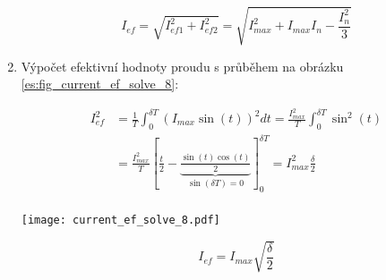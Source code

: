\begin{enumerate}
        \begin{equation}\label{es:eq_current_ef_solve_6}
          I_{ef} = \sqrt{I_{ef1}^2+I_{ef2}^2} = \sqrt{I_{max}^2+I_{max}I_{n} - \frac{I_n^2}{3}}
        \end{equation} 

      \item Výpočet efektivní hodnoty proudu s průběhem na obrázku \ref{es:fig_current_ef_solve_8}:

        \setlength{\parindent}{-10mm}
        \begin{minipage}[b]{0.6\textwidth}%
          \begin{align*}
            I_{ef}^2 
              &=  \frac{1}{T}\int_0^{\delta T}{\left(I_{max}\sin(t)\right)^2}dt=
                  \frac{I_{max}^2}{T}\int_0^{\delta T}{\sin^2(t)}                                 \\ 
              &=  \frac{I_{max}^2}{T}\left[\frac{t}{2}-
                  \underbrace{\frac{\sin(t)\cos(t)}{2}}_{\sin(\delta T)=0}\right]_0^{\delta T}=
                       I_{max}^2\frac{\delta}{2}                                                  \\
          \end{align*}
        \end{minipage} %
        \hspace{0.05\textwidth}
        \begin{minipage}[b]{0.3\textwidth}%
          \texttt{[image: current\_ef\_solve\_8.pdf]}
          \label{es:fig_current_ef_solve_8}
        \end{minipage}\newline
        
        \begin{equation}\label{es:eq_current_ef_solve_8}
           I_{ef} = I_{max}\sqrt{\frac{\delta}{2}} 
        \end{equation} 

    \end{enumerate}

\ChapterBiblioList   